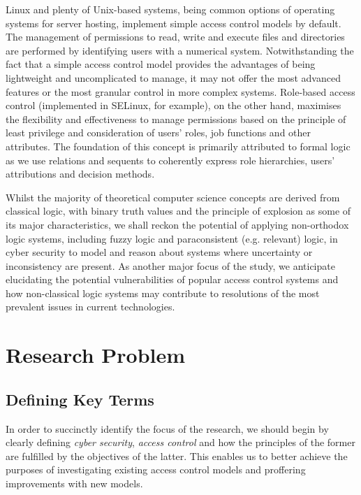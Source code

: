 \documentclass{article}
\begin{document}
Linux and plenty of Unix-based systems, being common options of operating systems for server hosting, implement simple access control models by default. The management of permissions to read, write and execute files and directories are performed by identifying users with a numerical system.\cite{ubuntu} Notwithstanding the fact that a simple access control model provides the advantages of being lightweight and uncomplicated to manage, it may not offer the most advanced features or the most granular control in more complex systems. Role-based access control (implemented in SELinux, for example), on the other hand, maximises the flexibility and effectiveness to manage permissions based on the principle of least privilege and consideration of users’ roles, job functions and other attributes. The foundation of this concept is primarily attributed to formal logic as we use relations and sequents to coherently express role hierarchies, users’ attributions and decision methods.\cite{rbac}

Whilst the majority of theoretical computer science concepts are derived from classical logic, with binary truth values and the principle of explosion as some of its major characteristics, we shall reckon the potential of applying non-orthodox logic systems, including fuzzy logic and paraconsistent (e.g. relevant) logic, in cyber security to model and reason about systems where uncertainty or inconsistency are present. As another major focus of the study, we anticipate elucidating the potential vulnerabilities of popular access control systems and how non-classical logic systems may contribute to resolutions of the most prevalent issues in current technologies.

\section*{Research Problem}

\subsection*{Defining Key Terms}

In order to succinctly identify the focus of the research, we should begin by clearly defining \textit{cyber security}, \textit{access control} and how the principles of the former are fulfilled by the objectives of the latter. This enables us to better achieve the purposes of investigating existing access control models and proffering improvements with new models.
\end{document}
